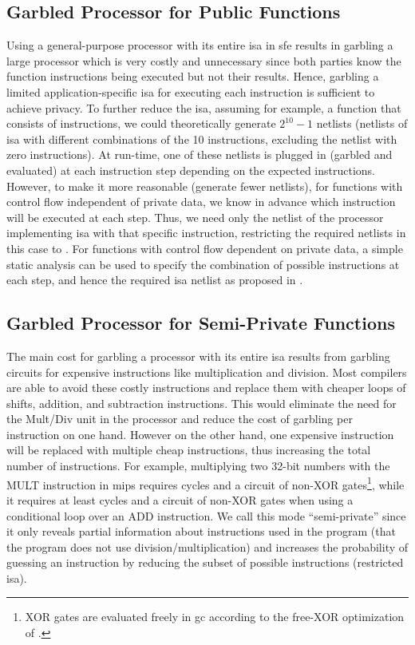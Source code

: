 \subsection{Garbled Processor for Public Functions}\label{ssec:processor-mips-sfe-public}
Using a general-purpose processor with its entire \acrshort{isa} in \acrshort{sfe} results in garbling a large processor which is very costly and unnecessary since both parties know the function instructions being executed but not their results.
Hence, garbling a limited application-specific \acrshort{isa} for executing each instruction is sufficient to achieve privacy.
To further reduce the \acrshort{isa}, assuming for example, a function that consists of  instructions, we could theoretically generate $2^{10} -1$ netlists (netlists of \acrshort{isa} with different combinations of the 10 instructions, excluding the netlist with zero instructions).
At run-time, one of these netlists is plugged in (garbled and evaluated) at each instruction step depending on the expected instructions.
However, to make it more reasonable (generate fewer netlists), for functions with control flow independent of private data, we know in advance which instruction will be executed at each step.
Thus, we need only the netlist of the processor implementing \acrshort{isa} with that specific instruction, restricting the required netlists in this case to .
For functions with control flow dependent on private data, a simple static analysis can be used to specify the combination of possible instructions at each step, and hence the required \acrshort{isa} netlist as proposed in \cite{wang2016secure}.

\subsection{Garbled Processor for Semi-Private Functions}\label{ssec:processor-mips-sfe-semiprivate}
The main cost for garbling a processor with its entire \acrshort{isa} results from garbling circuits for expensive instructions like multiplication and division.
Most compilers are able to avoid these costly instructions and replace them with cheaper loops of shifts, addition, and subtraction instructions.
This would eliminate the need for the Mult/Div unit in the processor and reduce the cost of garbling per instruction on one hand.
However on the other hand, one expensive instruction will be replaced with multiple cheap instructions, thus increasing the total number of instructions.
For example, multiplying two 32-bit numbers with the MULT instruction in \gls{mips} requires  cycles and a circuit of  non-XOR gates\footnote{XOR gates are evaluated freely in \acrshort{gc} according to the free-XOR optimization of \cite{kolesnikov2008improved}.}, while it requires at least  cycles and a circuit of  non-XOR gates when using a conditional loop over an ADD instruction.
We call this mode ``semi-private'' since it only reveals partial information about instructions used in the program (that the program does not use division/multiplication) and increases the probability of guessing an instruction by reducing the subset of possible instructions (restricted \acrshort{isa}).

